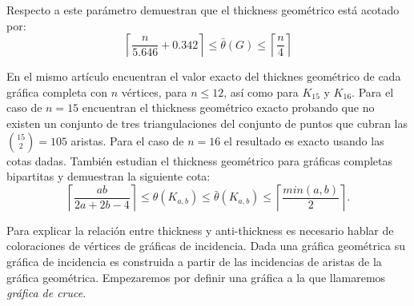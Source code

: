 
Respecto a este parámetro \cite{Dillencourt2004} demuestran que el thickness
geométrico está acotado por:
\[ \left\lceil \frac{n}{5.646} + 0.342 \right\rceil \leq  \bar{\theta}(G) \leq \left\lceil\frac{n}{4}\right\rceil \]

En el mismo artículo encuentran el valor exacto del thicknes geométrico
de cada gráfica completa con $n$ vértices, para $n\leq 12$, así como para $K_{15}$ y $K_{16}$.
Para el caso de $n=15$ encuentran el thickness geométrico exacto probando
que no existen un conjunto de tres triangulaciones del conjunto de puntos que
cubran las $\binom{15}{2} = 105$ aristas. Para el caso de $n=16$ el resultado
es exacto usando las cotas dadas.
También estudian el thickness geométrico para gráficas completas bipartitas y demuestran la
siguiente cota:
\[
  \left\lceil \frac{ab}{2a+2b-4} \right\rceil \leq \theta(K_{a,b}) \leq \bar{\theta}(K_{a,b})
  \leq \left\lceil \frac{min(a,b)}{2} \right\rceil.
\]


Para explicar la relación entre thickness y anti-thickness es necesario hablar
de coloraciones de vértices de gráficas de incidencia. Dada una gráfica geométrica
su gráfica de incidencia es construida a partir de las incidencias de aristas de la gráfica geométrica.
Empezaremos por definir una gráfica a la que llamaremos \emph{gráfica de cruce}.

